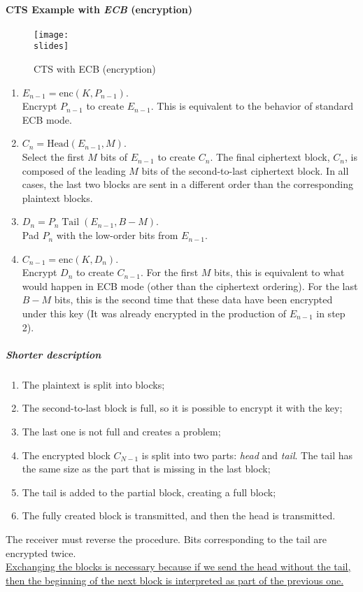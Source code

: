 \paragraph*{CTS Example with \textit{ECB} (encryption)}
\begin{figure}[h]
    \centering
    \texttt{[image: \\slides]}
    \caption{CTS with ECB (encryption)}
\end{figure}
\begin{enumerate}
    \item \(E_{n-1} = \text{enc}(K, P_{n-1})\).\\
          Encrypt \(P_{n-1}\) to create \(E_{n-1}\). This is equivalent to the behavior of standard ECB mode.
    \item \(C_n = \text{Head}(E_{n-1}, M)\).\\
          Select the first \(M\) bits of \(E_{n-1}\) to create \(C_n\). The final ciphertext block, \(C_n\), is composed of the leading \(M\) bits of the second-to-last ciphertext block. In all cases, the last two blocks are sent in a different order than the corresponding plaintext blocks.
    \item \(D_n = P_n \mathbin \text{Tail}(E_{n-1}, B-M)\).\\
          Pad \(P_n\) with the low-order bits from \(E_{n-1}\).
    \item \(C_{n-1} = \text{enc}(K, D_n)\).\\
          Encrypt \(D_n\) to create \(C_{n-1}\). For the first \(M\) bits, this is equivalent to what would happen in ECB mode (other than the ciphertext ordering). For the last \(B-M\) bits, this is the second time that these data have been encrypted under this key (It was already encrypted in the production of \(E_{n-1}\) in step 2).
\end{enumerate}



\subparagraph*{Shorter description}
\begin{enumerate}
    \item The plaintext is split into blocks;
    \item The second-to-last block is full, so it is possible to encrypt it with the key;
    \item The last one is not full and creates a problem;
    \item The encrypted block $C_{N-1}$ is split into two parts: \textit{head} and \textit{tail}. The tail has the same size as the part that is missing in the last block;
    \item The tail is added to the partial block, creating a full block;
    \item The fully created block is transmitted, and then the head is transmitted.
\end{enumerate}
The receiver must reverse the procedure. Bits corresponding to the tail are encrypted twice.\\ \ul{Exchanging the blocks is necessary because if we send the head without the tail, then the beginning of the next block is interpreted as part of the previous one.}

